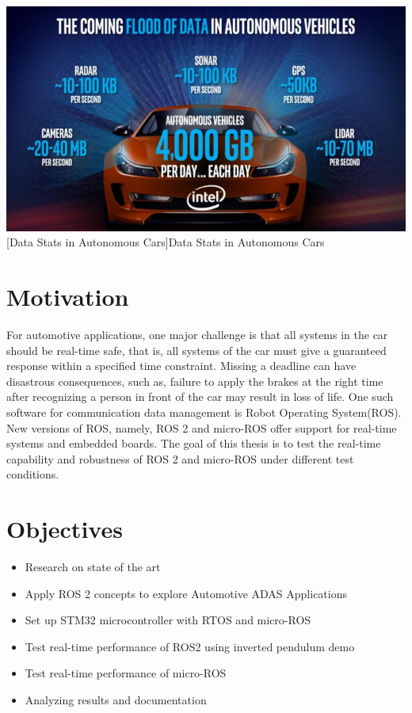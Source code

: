\documentclass[%
xelatex,
	oneside,		%
	12pt,			%
	parskip=half,	%
	abstracton,
	chapterprefix=true%
    appendixprefix=true]
{scrbook}
\begin{document}
\begin{center}
\includegraphics[scale=.5]{fig/autonomous-vehicle-data-intel-100697604-large.jpg}
[Data Stats in Autonomous Cars]{Data Stats in Autonomous Cars\cite{datastats}}
\label{fig:datastats}
\end{center}

  
     \section{Motivation}	
For automotive applications, one major challenge is that all systems in the car should be real-time safe, that is, all systems of the car must give a guaranteed response within a specified time constraint. Missing a deadline can have disastrous consequences, such as, failure to apply the brakes at the right time after recognizing a person in front of the car may result in loss of life. 
One such software for communication data management is Robot Operating System(ROS). New versions of ROS, namely, ROS 2 and micro-ROS offer support for real-time systems and embedded boards. The goal of this thesis is to test the real-time capability and robustness of ROS 2 and micro-ROS under different test conditions.
	 \section{Objectives}
\begin{itemize}
  \item Research on state of the art
  \item Apply ROS 2 concepts to explore Automotive ADAS Applications
  \item Set up STM32 microcontroller with RTOS and micro-ROS
  \item Test real-time performance of ROS2 using inverted pendulum demo  
  \item Test real-time performance of micro-ROS
  \item Analyzing results and documentation
\end{itemize}
	 
\end{document}
